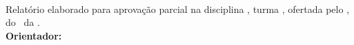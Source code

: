 \begin{center}
\autores
\vfill
{\bf\Large\titulo}\vspace{1cm}\\
{\raggedleft
\begin{minipage}[t]{0.53\textwidth}
Relatório elaborado para aprovação parcial na disciplina \disciplina, turma \turma, ofertada pelo \departamento, do \campus~da \universidade.
\vspace{12pt}\\
{\bf Orientador:} \prefixo~\orientador
\end{minipage}\\} 
\vfill
\local\\\ano
\end{center}
